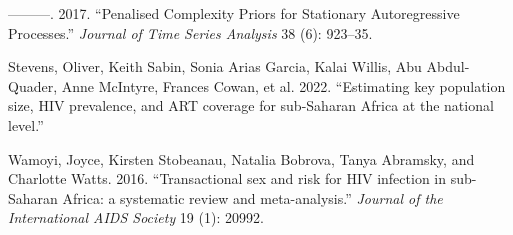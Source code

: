 \documentclass[
]{article}
\newlength{\cslhangindent}
\newlength{\cslentryspacingunit} %
\newenvironment{CSLReferences}[2] %
 {%
  \setlength{\parindent}{0pt}
  \ifodd #1
  \let\oldpar\par
  \def\par{\hangindent=\cslhangindent\oldpar}
  \fi
  \setlength{\parskip}{#2\cslentryspacingunit}
 }%
 {}
\begin{document}
\begin{CSLReferences}{1}{0}
\leavevmode{}%
---------. 2017. {``Penalised Complexity Priors for Stationary
Autoregressive Processes.''} \emph{Journal of Time Series Analysis} 38
(6): 923--35.

\leavevmode{}%
Stevens, Oliver, Keith Sabin, Sonia Arias Garcia, Kalai Willis, Abu
Abdul-Quader, Anne McIntyre, Frances Cowan, et al. 2022. {``{Estimating
key population size, HIV prevalence, and ART coverage for sub-Saharan
Africa at the national level}.''}

\leavevmode{}%
Wamoyi, Joyce, Kirsten Stobeanau, Natalia Bobrova, Tanya Abramsky, and
Charlotte Watts. 2016. {``{Transactional sex and risk for HIV infection
in sub-Saharan Africa: a systematic review and meta-analysis}.''}
\emph{Journal of the International AIDS Society} 19 (1): 20992.

\end{CSLReferences}
\end{document}
